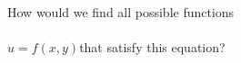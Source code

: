 \documentclass[preview]{standalone}
\begin{document}
\begin{center}
How would we find all possible functions\\\\$u$$=$$f(x, y)$that satisfy this equation?
\end{center}
\end{document}
